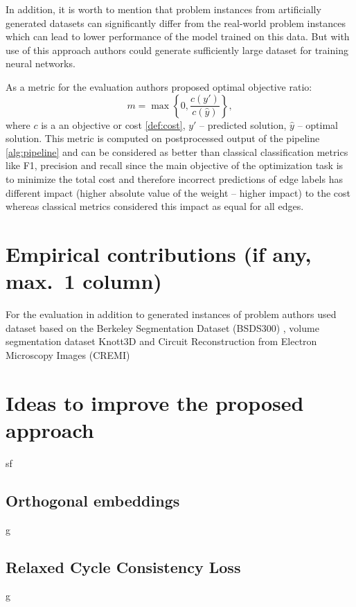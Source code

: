\documentclass[10pt, twocolumn, a4paper]{article}
\theoremstyle{definition}
\begin{document}
In addition, it is worth to mention that problem instances from artificially generated datasets can
significantly differ from the real-world problem instances which can lead to lower performance of the model
trained on this data. But with use of this approach authors could generate sufficiently large
dataset for training neural networks.

As a metric for the evaluation authors proposed optimal objective ratio:
\[
    m = \max \left\{ 0, \frac{c(y')}{c(\hat{y})} \right\},
\]
where $c$ is a an objective or cost \eqref{def:cost}, $y'$ -- predicted solution,
$\hat{y}$ -- optimal solution. This metric is computed on postprocessed output of the
pipeline \ref{alg:pipeline} and can be considered as better than classical classification
metrics like F1, precision and recall since the main objective of the optimization task is to
minimize the total cost and therefore incorrect predictions of edge labels has different impact (higher absolute value
of the weight -- higher impact) to the cost whereas classical metrics considered this impact as
equal for all edges.

\section{Empirical contributions (if any, max.~1 column)}

For the evaluation in addition to generated instances of problem authors used
dataset \citet{andres2011probabilistic} based on the Berkeley Segmentation Dataset (BSDS300) \citet{martin2001database},
volume segmentation dataset Knott3D \citet{andres2012globally} and
Circuit Reconstruction from Electron Microscopy Images (CREMI) \citet{beier2017multicut}


\section{Ideas to improve the proposed approach}
sf

\subsection{Orthogonal embeddings} \label{sec:ortho_emb}
g

\subsection{Relaxed Cycle Consistency Loss}
g
\end{document}
